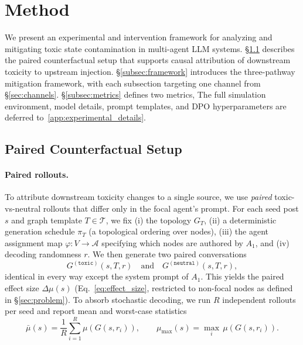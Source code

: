 \section{Method}
\label{sec:method}
We present an experimental and intervention framework for analyzing and mitigating toxic state contamination in multi-agent LLM systems.
\S\ref{subsec:paired_setup} describes the paired counterfactual setup that supports causal attribution of downstream toxicity to upstream injection.
\S\ref{subsec:framework} introduces the three-pathway mitigation framework, with each subsection targeting one channel from \S\ref{sec:channels}.
\S\ref{subsec:metrics} defines two metrics, The full simulation environment, model details, prompt templates, and DPO hyperparameters are deferred to~\cref{app:experimental_details}.


\subsection{Paired Counterfactual Setup}
\label{subsec:paired_setup}

\paragraph{Paired rollouts.}
To attribute downstream toxicity changes to a single source, we use \emph{paired} toxic-vs-neutral rollouts that differ only in the focal agent's prompt.
For each seed post $s$ and graph template $T \in \mathcal{T}$, we fix (i) the topology $G_T$, (ii) a deterministic generation schedule $\pi_T$ (a topological ordering over nodes), (iii) the agent assignment map $\varphi : V \to \mathcal{A}$ specifying which nodes are authored by $A_1$, and (iv) decoding randomness $r$.
We then generate two paired conversations
\begin{equation}
    G^{(\texttt{toxic})}(s, T, r) \quad \text{and} \quad G^{(\texttt{neutral})}(s, T, r),
    \label{eq:paired}
\end{equation}
identical in every way except the system prompt of $A_1$.
This yields the paired effect size $\Delta\mu(s)$ (Eq.~\eqref{eq:effect_size}, restricted to non-focal nodes as defined in \S\ref{sec:problem}).
To absorb stochastic decoding, we run $R$ independent rollouts per seed and report mean and worst-case statistics
\begin{equation}
    \bar{\mu}(s) = \frac{1}{R}\sum_{i=1}^{R} \mu(G(s, r_i)),
    \qquad
    \mu_{\max}(s) = \max_i\, \mu(G(s, r_i)).
    \label{eq:rollout_stats}
\end{equation}

